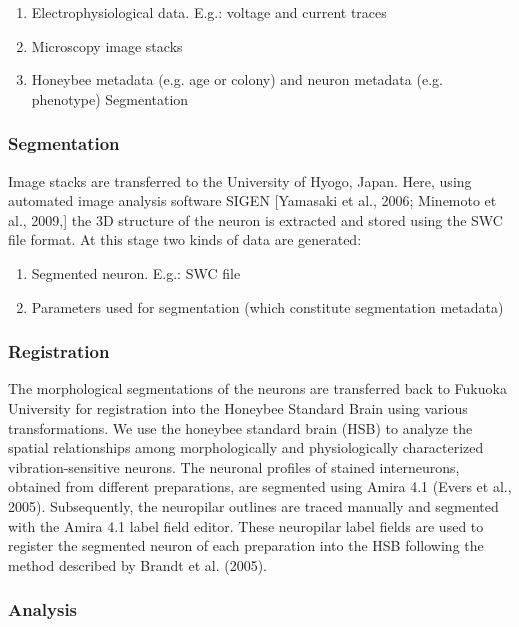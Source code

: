 \documentclass{frontiersSCNS} %
\begin{document}
\begin{enumerate}
\item Electrophysiological data. E.g.: voltage and current traces
\item Microscopy image stacks
\item Honeybee metadata (e.g. age or colony) and neuron metadata (e.g. phenotype) Segmentation
\end{enumerate}

\subsubsection{Segmentation}

Image stacks are transferred to the University of Hyogo, Japan. Here, using
automated image analysis software SIGEN [Yamasaki et al., 2006; Minemoto et
al., 2009,] the 3D structure of the neuron is extracted and stored using the
SWC file format. At this stage two kinds of data are generated:

\begin{enumerate}
\item Segmented neuron. E.g.: SWC file
\item Parameters used for segmentation (which constitute segmentation metadata)
\end{enumerate}


\subsubsection{Registration}

The morphological segmentations of the neurons are transferred back to Fukuoka
University for registration into the Honeybee Standard Brain using various
transformations. We use the honeybee standard brain (HSB) to analyze the
spatial relationships among morphologically and physiologically characterized
vibration-sensitive neurons. The neuronal profiles of stained interneurons,
obtained from different preparations, are segmented  using Amira 4.1 (Evers et
al., 2005). Subsequently, the neuropilar outlines are traced manually and
segmented with the Amira 4.1 label field editor. These neuropilar label fields
are used to register the segmented neuron of each preparation into the HSB
following the method described by Brandt et al. (2005).


\subsubsection{Analysis}
\end{document}
